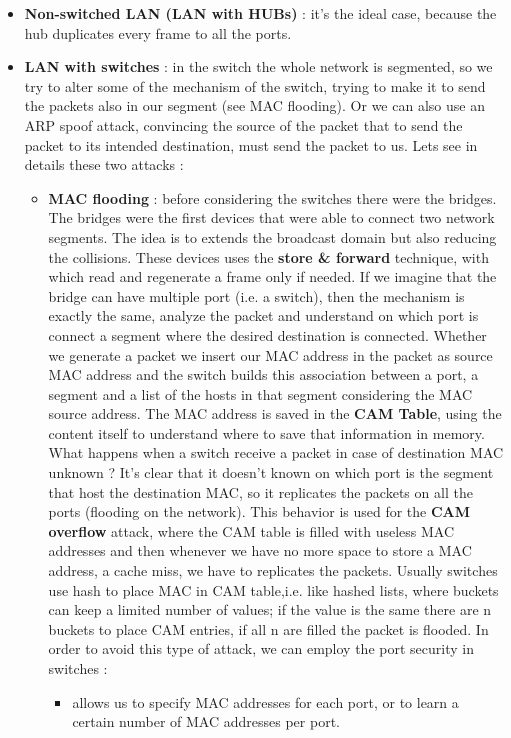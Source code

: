 \documentclass[11pt]{article}
\begin{document}
\begin{itemize}
\item \textbf{Non-switched LAN (LAN with HUBs)} : it's the ideal case, because the hub duplicates every frame to all the ports.
\item \textbf{LAN with switches} : in the switch the whole network is segmented, so we try to alter some of the mechanism of the switch, trying to make it to send the packets also in our segment (see MAC flooding). Or we can also use an ARP spoof attack, convincing the source of the packet that to send the packet to its intended destination, must send the packet to us. Lets see in details these two attacks :
\begin{itemize}
\item \textbf{MAC flooding} : before considering the switches there were the bridges. The bridges were the first devices that were able to connect two network segments. The idea is to extends the broadcast domain but also reducing the collisions. These devices uses the \textbf{store \& forward} technique, with which read and regenerate a frame only if needed. If we imagine that the bridge can have multiple port (i.e. a switch), then the mechanism is exactly the same, analyze the packet and understand on which port is connect a segment where the desired destination is connected. Whether we generate a packet we insert our MAC address in the packet as source MAC address and the switch builds this association between a port, a segment and a list of the hosts in that segment considering the MAC source address. The MAC address is saved in the \textbf{CAM Table}, using the content itself to understand where to save that information in memory. What happens when a switch receive a packet in case of destination MAC unknown ? It's clear that it doesn't known on which port is the segment that host the destination MAC, so it replicates the packets on all the ports (flooding on the network). This behavior is used for the \textbf{CAM overflow} attack, where the CAM table is filled with useless MAC addresses and then whenever we have no more space to store a MAC address, a cache miss, we have to replicates the packets. Usually switches use hash to place MAC in CAM table,i.e. like hashed lists, where buckets can keep a limited number of values; if the value is the same there are n buckets to place CAM entries, if all n are filled the packet is flooded. In order to avoid this type of attack, we can employ the port security in switches :
\begin{itemize}
\item allows us to specify MAC addresses for each port, or to learn a certain number of MAC addresses per port.

\end{itemize}
\end{itemize}
\end{itemize}
\end{document}
